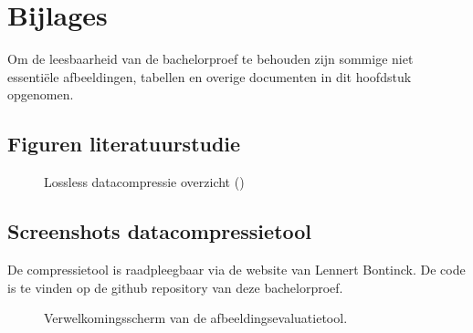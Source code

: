 \chapter{Bijlages}
\label{ch:bijlages}

Om de leesbaarheid van de bachelorproef te behouden zijn sommige niet essentiële afbeeldingen, tabellen en overige documenten in dit hoofdstuk opgenomen. 

\section{Figuren literatuurstudie}
\label{sec:bijlages-literatuurstudie}

\FloatBarrier
\begin{figure}[h!]
	\centering
	\caption{Lossless datacompressie overzicht (\cite{ethwcompressionhistory})}
	\label{fig:lossles-datacompressie-overzicht}
\end{figure}
\FloatBarrier

\section{Screenshots datacompressietool}
\label{sec:bijlages-screenshot-datacompressietool}

De \gls{compressietool} is raadpleegbaar via de website van Lennert Bontinck. De code is te vinden op de \gls{github} repository van deze bachelorproef.

\FloatBarrier
\begin{figure}[h!]
	\caption{Verwelkomingsscherm van de \gls{afbeeldingsevaluatietool}.}
	\label{fig:bijlages-screenshot-datacompressietool-index}
\end{figure}
\FloatBarrier

